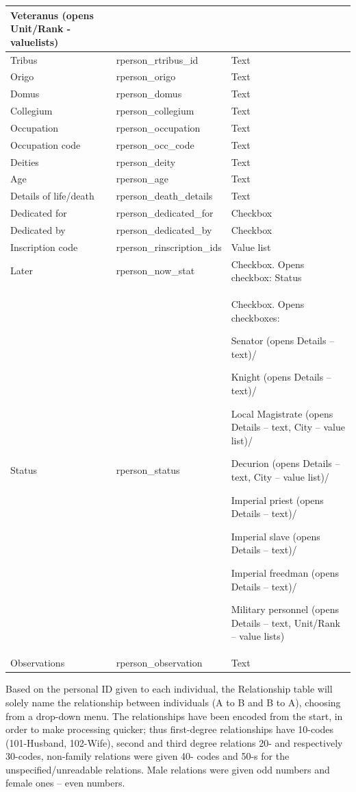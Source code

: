 \documentclass[amsthm,ebook]{saparticle}
\begin{document}
\begin{center}
\begin{supertabular}{|m{3.711cm}|m{2.941cm}|m{4.046cm}|}
Veteranus (opens Unit/Rank - valuelists)\\\hline
Tribus &
rperson\_rtribus\_id &
Text\\\hline
Origo &
rperson\_origo &
Text\\\hline
Domus &
rperson\_domus &
Text\\\hline
Collegium &
rperson\_collegium &
Text\\\hline
Occupation &
rperson\_occupation &
Text\\\hline
Occupation code &
rperson\_occ\_code &
Text\\\hline
Deities &
rperson\_deity &
Text\\\hline
Age &
rperson\_age &
Text\\\hline
Details of life/death &
rperson\_death\_details &
Text\\\hline
Dedicated for &
rperson\_dedicated\_for &
Checkbox\\\hline
Dedicated by &
rperson\_dedicated\_by &
Checkbox\\\hline
Inscription code &
rperson\_rinscription\_ids &
Value list\\\hline
Later &
rperson\_now\_stat &
Checkbox. Opens checkbox: Status\\\hline
Status &
rperson\_status &
Checkbox. Opens checkboxes: 

Senator (opens Details – text)/

Knight (opens Details – text)/

Local Magistrate (opens Details – text, City – value list)/

Decurion (opens Details – text, City – value list)/

Imperial priest (opens Details – text)/

Imperial slave (opens Details – text)/

Imperial freedman (opens Details – text)/

Military personnel (opens Details – text, Unit/Rank – value lists)\\\hline
Observations &
rperson\_observation &
Text\\\hline
\end{supertabular}
\label{tab:personaldata}
\end{center}


Based on the personal ID given to each individual, the Relationship table will solely name the relationship between
individuals (A to B and B to A), choosing from a drop-down menu. The relationships have been encoded from the start, in
order to make processing quicker; thus first-degree relationships have 10-codes (101-Husband, 102-Wife), second and
third degree relations 20- and respectively 30-codes, non-family relations were given 40- codes and 50-s for the
unspecified/unreadable relations. Male relations were given odd numbers and female ones – even numbers. 
\end{document}
